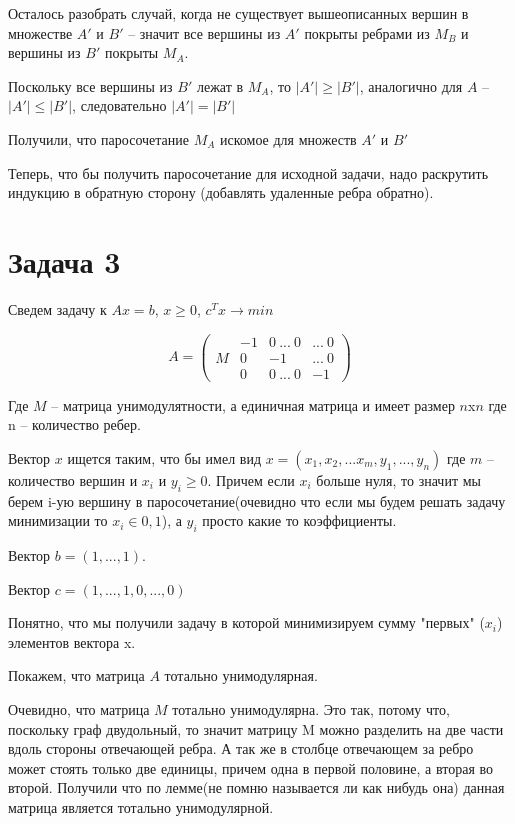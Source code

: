 \documentclass{article}
\begin{document}
Осталось разобрать случай, когда не существует вышеописанных вершин в множестве $A'$ и $B'$ -- значит все вершины из $A'$ покрыты ребрами из $M_B$ и вершины из $B'$ покрыты $M_A$.

Поскольку все вершины из $B'$ лежат в $M_A$, то $|A'| \geq |B'|$, аналогично для $A$ -- $|A'| \leq |B'|$, следовательно $|A'| = |B'|$

Получили, что паросочетание $M_A$ искомое для множеств $A'$ и  $B'$

Теперь, что бы получить паросочетание для исходной задачи, надо раскрутить индукцию в обратную сторону (добавлять удаленные ребра обратно).


\section{Задача 3}

Сведем задачу к $Ax = b$, $x \geq 0$, $c^Tx \rightarrow min$


$$
A =
\left(
\begin{array}{c|ccc}
			& 	-1 	& 	0\ ...\ 0	&	...\ 0\\
		M	&	0  	&	 -1	&	...\ 0\\
			& 	0	&	0\ ...\ 0	&	-1
\end{array}\right)
$$


Где $M$ -- матрица унимодулятности, а единичная матрица и имеет размер $n$x$n$ где n -- количество ребер.

Вектор  $x$ ищется таким, что бы имел вид $x = (x_1, x_2, ... x_m, y_1, ..., y_n)$ где $m$ -- количество вершин и $x_i$ и $y_i \geq 0$. Причем если $x_i$ больше нуля, то значит мы берем i-ую вершину в паросочетание(очевидно что если мы будем решать задачу минимизации то $x_i \in {0, 1}$), а $y_i$ просто какие то коэффициенты.

Вектор $b = (1, ..., 1)$.

Вектор $c = (1, ..., 1, 0,..., 0)$

Понятно, что мы получили задачу в которой минимизируем сумму "первых" ($x_i$) элементов вектора x.

Покажем, что матрица $A$ тотально унимодулярная.

Очевидно, что матрица $M$ тотально унимодулярна. Это так, потому что, поскольку граф двудольный, то значит матрицу M можно разделить на две части вдоль стороны отвечающей ребра. А так же в столбце отвечающем за ребро может стоять только две единицы, причем одна в первой половине, а вторая во второй. Получили что по лемме(не помню называется ли как нибудь она) данная матрица является тотально унимодулярной.
\end{document}
